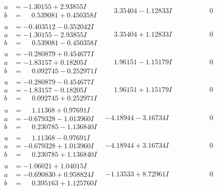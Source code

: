 \documentclass[1p]{elsarticle_modified}
\theoremstyle{definition}
\begin{document}
$$\begin{array}{c|c|c}
\begin{aligned}
a &= -1.30155 + 2.93855 I \\
b &= \phantom{-}0.539081 + 0.450358 I\end{aligned}
 & \phantom{-}3.35404 - 1.12833 I & \phantom{-0.000000 } 0 \\ \hline\begin{aligned}
u &= -0.403512 - 0.352042 I \\
a &= -1.30155 - 2.93855 I \\
b &= \phantom{-}0.539081 - 0.450358 I\end{aligned}
 & \phantom{-}3.35404 + 1.12833 I & \phantom{-0.000000 } 0 \\ \hline\begin{aligned}
u &= -0.280879 + 0.454677 I \\
a &= -1.83157 + 0.18205 I \\
b &= \phantom{-}0.092745 - 0.252971 I\end{aligned}
 & \phantom{-}1.96151 - 1.15179 I & \phantom{-0.000000 } 0 \\ \hline\begin{aligned}
u &= -0.280879 - 0.454677 I \\
a &= -1.83157 - 0.18205 I \\
b &= \phantom{-}0.092745 + 0.252971 I\end{aligned}
 & \phantom{-}1.96151 + 1.15179 I & \phantom{-0.000000 } 0 \\ \hline\begin{aligned}
u &= \phantom{-}1.11368 + 0.97691 I \\
a &= -0.679328 - 1.013960 I \\
b &= \phantom{-}0.230785 - 1.136840 I\end{aligned}
 & -4.18944 - 3.16734 I & \phantom{-0.000000 } 0 \\ \hline\begin{aligned}
u &= \phantom{-}1.11368 - 0.97691 I \\
a &= -0.679328 + 1.013960 I \\
b &= \phantom{-}0.230785 + 1.136840 I\end{aligned}
 & -4.18944 + 3.16734 I & \phantom{-0.000000 } 0 \\ \hline\begin{aligned}
u &= -1.06021 + 1.04015 I \\
a &= -0.690830 + 0.958824 I \\
b &= \phantom{-}0.395163 + 1.125760 I\end{aligned}
 & -1.13533 + 8.72961 I & \phantom{-0.000000 } 0\\

\end{array}$$
\end{document}
